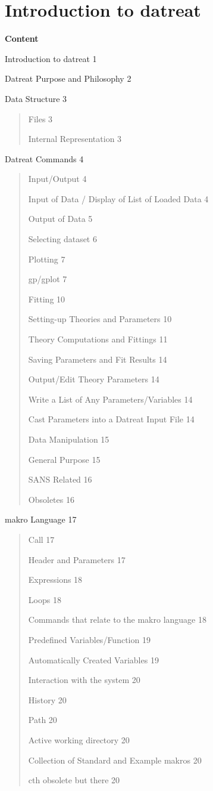 \documentclass[]{article}
\date{}
\begin{document}
\hypertarget{introduction-to-datreat}{%
\section{Introduction to datreat}\label{introduction-to-datreat}}

\textbf{Content}

Introduction to datreat 1

Datreat Purpose and Philosophy 2

Data Structure 3

\begin{quote}
Files 3

Internal Representation 3
\end{quote}

Datreat Commands 4

\begin{quote}
Input/Output 4

Input of Data / Display of List of Loaded Data 4

Output of Data 5

Selecting dataset 6

Plotting 7

gp/gplot 7

Fitting 10

Setting-up Theories and Parameters 10

Theory Computations and Fittings 11

Saving Parameters and Fit Results 14

Output/Edit Theory Parameters 14

Write a List of Any Parameters/Variables 14

Cast Parameters into a Datreat Input File 14

Data Manipulation 15

General Purpose 15

SANS Related 16

Obsoletes 16
\end{quote}

makro Language 17

\begin{quote}
Call 17

Header and Parameters 17

Expressions 18

Loops 18

Commands that relate to the makro language 18

Predefined Variables/Function 19

Automatically Created Variables 19

Interaction with the system 20

History 20

Path 20

Active working directory 20

Collection of Standard and Example makros 20

cth obsolete but there 20
\end{quote}
\end{document}
